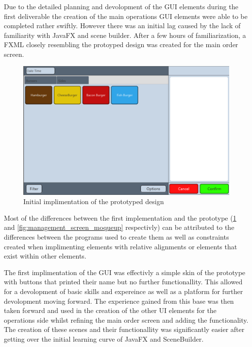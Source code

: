 
Due to the detailed planning and devolopment of the GUI elements during the first deliverable the creation of the main operations GUI elements were able to be completed rather swiftly. However there was an initial lag caused by the lack of familiarity with JavaFX and scene builder. After a few hours of familiarization, a FXML closely resembling the protoyped design was created for the main order screen. 

\begin{figure}[ht]
	\centering
	\includegraphics[width=150mm]{images/old_order_screen.png}
	\caption{Initial implimentation of the prototyped design}
	\label{fig:old_order_screen}
\end{figure}

Most of the differences between the first implementation and the prototype (\ref{fig:old_order_screen} and \ref{fig:management_screen_moqueup} respectivly) can be attributed to the differences between the programs used to create them as well as constraints created when implimenting elements with relative alignments or elements that exist within other elements.

The first implimentation of the GUI was effectivly a simple skin of the prototype with buttons that printed their name but no further functionallity. This allowed for a devolopment of basic skills and expereince as well as a platform for further devolopment moving forward. The experience gained from this base was then taken forward and used in the creation of the other UI elements for the operations side whilst refining the main order screen and adding the functionality. The creation of these scenes and their functionallity was significantly easier after getting over the initial learning curve of JavaFX and SceneBuilder.

